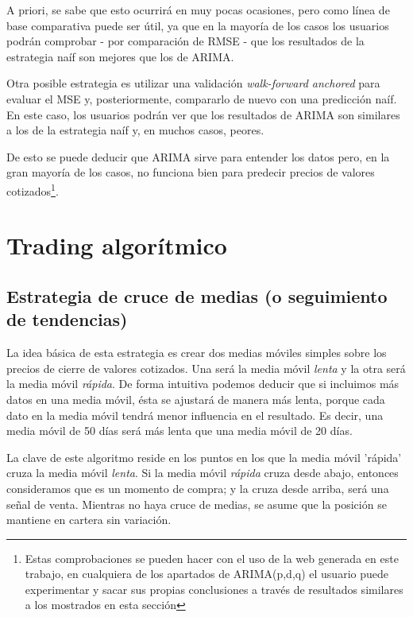 A priori, se sabe que esto ocurrirá en muy pocas ocasiones, pero como línea de base comparativa puede ser útil, ya que en la mayoría de los casos los usuarios podrán comprobar - por comparación de RMSE - que los resultados de la estrategia naíf son mejores que los de ARIMA. 


Otra posible estrategia es utilizar una validación \emph{walk-forward anchored}\citep{online:walk_forward} para evaluar el MSE y, posteriormente, compararlo de nuevo con una predicción naíf. En este caso, los usuarios podrán ver que los resultados de ARIMA son similares a los de la estrategia naíf y, en muchos casos, peores. 


De esto se puede deducir que ARIMA sirve para entender los datos pero, en la gran mayoría de los casos, no funciona bien para predecir precios de valores cotizados\footnote{Estas comprobaciones se pueden hacer con el uso de la web generada en este trabajo, en cualquiera de los apartados de ARIMA(p,d,q) el usuario puede experimentar y sacar sus propias conclusiones a través de resultados similares a los mostrados en esta sección}. 


\section{Trading algorítmico}\label{algo_trading}

\subsection{Estrategia de cruce de medias (o seguimiento de tendencias)}

La idea básica de esta estrategia es crear dos medias móviles simples sobre los precios de cierre de valores cotizados. Una será la media móvil \emph{lenta} y la otra será la media móvil \emph{rápida}. De forma intuitiva podemos deducir que si incluimos más datos en una media móvil, ésta se ajustará de manera más lenta, porque cada dato en la media móvil tendrá menor influencia en el resultado. Es decir, una media móvil de 50 días será más lenta que una media móvil de 20 días. 

La clave de este algoritmo reside en los puntos en los que la media móvil 'rápida' cruza la media móvil \emph{lenta}. Si la media móvil \emph{rápida} cruza desde abajo, entonces consideramos que es un momento de compra; y la cruza desde arriba, será una señal de venta. Mientras no haya cruce de medias, se asume que la posición se mantiene en cartera sin variación. 

